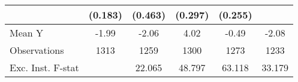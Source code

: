 {\begin{tabular}{l*{5}{c}}
            &     (0.183)         &     (0.463)         &     (0.297)         &     (0.255)         &                     \\
\midrule
Mean Y      &       -1.99         &       -2.06         &        4.02         &       -0.49         &       -2.08         \\
Observations&        1313         &        1259         &        1300         &        1273         &        1233         \\
Exc. Inst. F-stat&                     &      22.065         &      48.797         &      63.118         &      33.179         \\
\bottomrule
\end{tabular}
}
